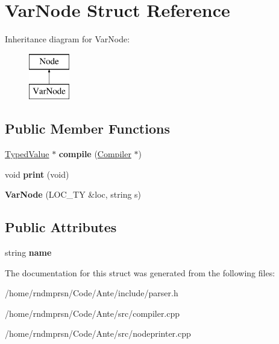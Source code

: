 \hypertarget{structVarNode}{}\section{Var\+Node Struct Reference}
\label{structVarNode}
Inheritance diagram for Var\+Node\+:\begin{figure}[H]
\begin{center}
\leavevmode
\includegraphics[height=2.000000cm]{structVarNode}
\end{center}
\end{figure}
\subsection*{Public Member Functions}
\begin{DoxyCompactItemize}
\item 
\mbox{\label{structVarNode_a8c77f04789e1c2cb669cea92bbc5feb0}} 
\hyperlink{structTypedValue}{Typed\+Value} $\ast$ {\bfseries compile} (\hyperlink{structante_1_1Compiler}{Compiler} $\ast$)
\item 
\mbox{\label{structVarNode_a902fff92c3ff989896fa95e6468be600}} 
void {\bfseries print} (void)
\item 
\mbox{\label{structVarNode_ace95678c4dcd3b0280f7583af8522653}} 
{\bfseries Var\+Node} (L\+O\+C\+\_\+\+TY \&loc, string s)
\end{DoxyCompactItemize}
\subsection*{Public Attributes}
\begin{DoxyCompactItemize}
\item 
\mbox{\label{structVarNode_a10b84cf6cba3a81ead1637cc5d373e95}} 
string {\bfseries name}
\end{DoxyCompactItemize}


The documentation for this struct was generated from the following files\+:\begin{DoxyCompactItemize}
\item 
/home/rndmprsn/\+Code/\+Ante/include/parser.\+h\item 
/home/rndmprsn/\+Code/\+Ante/src/compiler.\+cpp\item 
/home/rndmprsn/\+Code/\+Ante/src/nodeprinter.\+cpp\end{DoxyCompactItemize}
